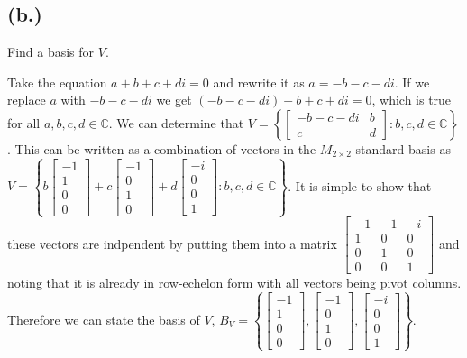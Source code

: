 \documentclass{article}
\begin{document}
	\subsection*{(b.)}
		Find a basis for $V$.

			Take the equation $a + b + c + di = 0$ and rewrite it as $a=-b-c-di$.
			If we replace $a$ with $-b-c-di$ we get $(-b-c-di)+b+c+di=0$, which is true for all $a,b,c,d \in \mathbb{C}$.
			We can determine that $V = \left\{\begin{bmatrix}-b-c-di&b\\c&d\end{bmatrix}: b,c,d \in \mathbb{C}\right\}$.
			This can be written as a combination of vectors in the $M_{2\times2}$ standard basis as $V= \left\{b\begin{bmatrix}-1\\1\\0\\0\end{bmatrix}+c\begin{bmatrix}-1\\0\\1\\0\end{bmatrix}+d\begin{bmatrix}-i\\0\\0\\1\end{bmatrix}:b,c,d \in \mathbb{C} \right\}$.
			It is simple to show that these vectors are indpendent by putting them into a matrix $\begin{bmatrix}-1&-1&-i\\1&0&0\\0&1&0\\0&0&1\end{bmatrix}$ and noting that it is already in row-echelon form with all vectors being pivot columns.
			Therefore we can state the basis of $V$, $B_V = \left\{\begin{bmatrix}-1\\1\\0\\0\end{bmatrix},\begin{bmatrix}-1\\0\\1\\0\end{bmatrix},\begin{bmatrix}-i\\0\\0\\1\end{bmatrix}\right\}$.
\end{document}
